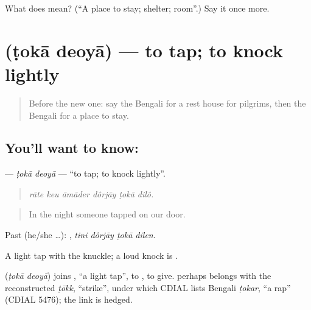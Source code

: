 \begin{tcolorbox}[breakable,colback=teal!4,colframe=teal!35!black,title={Before you move on}]
What does  mean? (\textquotedblleft{}A place to stay; shelter; room\textquotedblright{}.) Say it once more.
\end{tcolorbox}
\section[\texorpdfstring{\bn{টোকা} \bn{দেওয়া} (ṭokā deoyā)}{টোকা দেওয়া (ṭokā deoyā)}]{  (ṭokā deoyā) — to tap; to knock lightly}

\label{lesson:BN-C406-toka-deoya}



\begin{quote}
Before the new one: say the Bengali for a rest house for pilgrims, then the Bengali for a place to stay.
\end{quote}

\subsection*{You'll want to know:  }
\textbf{ } — \emph{ṭokā deoyā} — \textquotedblleft{}to tap; to knock lightly\textquotedblright{}.

\begin{quote}
     
\end{quote}

\begin{quote}
\emph{rāte keu āmāder dôrjāy ṭokā dilô.}
\end{quote}

\begin{quote}
In the night someone tapped on our door.
\end{quote}

Past (he/she …):    , \emph{tini dôrjāy ṭokā dilen}.

A light tap with the knuckle; a loud knock is  .

\begin{cousinweb}
\textbf{ } (\emph{ṭokā deoyā}) joins , \textquotedblleft{}a light tap\textquotedblright{}, to , to give.  perhaps belongs with the reconstructed \emph{ṭōkk}, \textquotedblleft{}strike\textquotedblright{}, under which CDIAL lists Bengali \emph{ṭokar}, \textquotedblleft{}a rap\textquotedblright{} (CDIAL 5476); the link is hedged.
\end{cousinweb}

